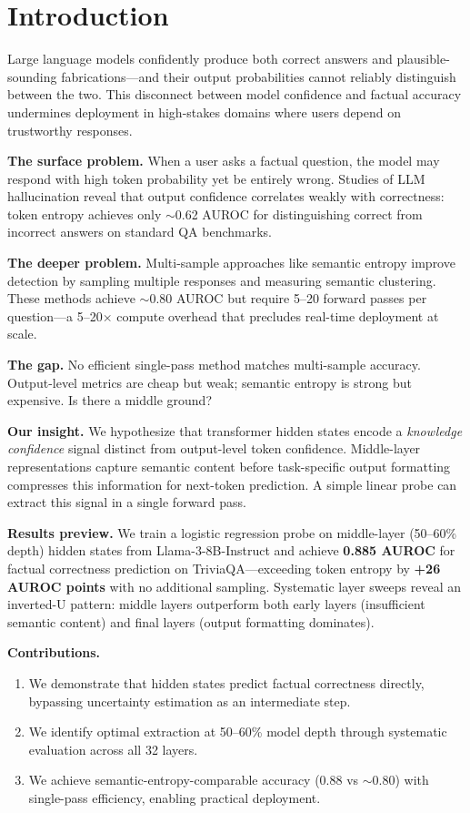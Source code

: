 \section{Introduction}

Large language models confidently produce both correct answers and plausible-sounding fabrications---and their output probabilities cannot reliably distinguish between the two. This disconnect between model confidence and factual accuracy undermines deployment in high-stakes domains where users depend on trustworthy responses.

\textbf{The surface problem.} When a user asks a factual question, the model may respond with high token probability yet be entirely wrong. Studies of LLM hallucination reveal that output confidence correlates weakly with correctness: token entropy achieves only $\sim$0.62 AUROC for distinguishing correct from incorrect answers on standard QA benchmarks.

\textbf{The deeper problem.} Multi-sample approaches like semantic entropy improve detection by sampling multiple responses and measuring semantic clustering. These methods achieve $\sim$0.80 AUROC but require 5--20 forward passes per question---a 5--20$\times$ compute overhead that precludes real-time deployment at scale.

\textbf{The gap.} No efficient single-pass method matches multi-sample accuracy. Output-level metrics are cheap but weak; semantic entropy is strong but expensive. Is there a middle ground?

\textbf{Our insight.} We hypothesize that transformer hidden states encode a \emph{knowledge confidence} signal distinct from output-level token confidence. Middle-layer representations capture semantic content before task-specific output formatting compresses this information for next-token prediction. A simple linear probe can extract this signal in a single forward pass.

\textbf{Results preview.} We train a logistic regression probe on middle-layer (50--60\% depth) hidden states from Llama-3-8B-Instruct and achieve \textbf{0.885 AUROC} for factual correctness prediction on TriviaQA---exceeding token entropy by \textbf{+26 AUROC points} with no additional sampling. Systematic layer sweeps reveal an inverted-U pattern: middle layers outperform both early layers (insufficient semantic content) and final layers (output formatting dominates).

\textbf{Contributions.}
\begin{enumerate}
    \item We demonstrate that hidden states predict factual correctness directly, bypassing uncertainty estimation as an intermediate step.
    \item We identify optimal extraction at 50--60\% model depth through systematic evaluation across all 32 layers.
    \item We achieve semantic-entropy-comparable accuracy (0.88 vs $\sim$0.80) with single-pass efficiency, enabling practical deployment.
\end{enumerate}

